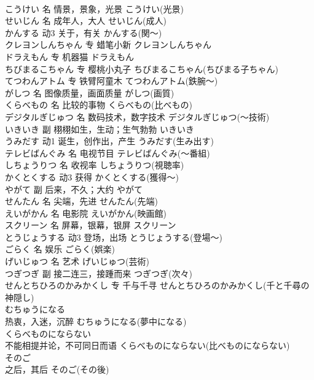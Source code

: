 \documentclass[8pt]{extreport}
\begin{document}
\begin{CJK}{UTF8}{min}
\\	こうけい	名	情景，景象，光景	こうけい(光景)	
\\	せいじん	名	成年人，大人	せいじん(成人)	
\\	かんする	动3	关于，有关	かんする(関～)	
\\	クレヨンしんちゃん	专	蜡笔小新	クレヨンしんちゃん	
\\	ドラえもん	专	机器猫	ドラえもん	
\\	ちびまるこちゃん	专	樱桃小丸子	ちびまるこちゃん(ちびまる子ちゃん)	
\\	てつわんアトム	专	铁臂阿童木	てつわんアトム(鉄腕～)	
\\	がしつ	名	图像质量，画面质量	がしつ(画質)	
\\	くらべもの	名	比较的事物	くらべもの(比べもの)	
\\	デジタルぎじゅつ	名	数码技术，数字技术	デジタルぎじゅつ(～技術)	
\\	いきいき	副	栩栩如生，生动；生气勃勃	いきいき	
\\	うみだす	动1	诞生，创作出，产生	うみだす(生み出す)	
\\	テレビばんぐみ	名	电视节目	テレビばんぐみ(～番組)	
\\	しちょうりつ	名	收视率	しちょうりつ(視聴率)	
\\	かくとくする	动3	获得	かくとくする(獲得～)	
\\	やがて	副	后来，不久；大约	やがて	
\\	せんたん	名	尖端，先进	せんたん(先端)	
\\	えいがかん	名	电影院	えいがかん(映画館)	
\\	スクリーン	名	屏幕，银幕，银屏	スクリーン	
\\	とうじょうする	动3	登场，出场	とうじょうする(登場～)	
\\	ごらく	名	娱乐	ごらく(娯楽)	
\\	げいじゅつ	名	艺术	げいじゅつ(芸術)	
\\	つぎつぎ	副	接二连三，接踵而来	つぎつぎ(次々)	
\\	せんとちひろのかみかくし	专	千与千寻	せんとちひろのかみかくし(千と千尋の神隠し)	
\\	むちゅうになる	
\\	热衷，入迷，沉醉	むちゅうになる(夢中になる)	
\\	くらべものにならない	
\\	不能相提并论，不可同日而语	くらべものにならない(比べものにならない)	
\\	そのご	
\\	之后，其后	そのご(その後)	

\end{CJK}
\end{document}
